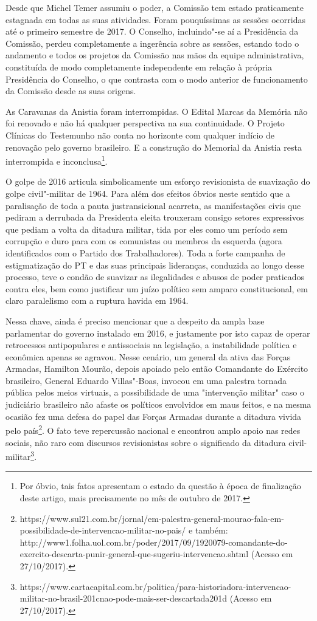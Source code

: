 Desde que Michel Temer assumiu o poder, a Comissão tem estado
praticamente estagnada em todas as suas atividades. Foram pouquíssimas
as sessões ocorridas até o primeiro semestre de 2017. O Conselho,
incluindo"-se aí a Presidência da Comissão, perdeu completamente a
ingerência sobre as sessões, estando todo o andamento e todos os
projetos da Comissão nas mãos da equipe administrativa, constituída de
modo completamente independente em relação à própria Presidência do
Conselho, o que contrasta com o modo anterior de funcionamento da
Comissão desde as suas origens.

As Caravanas da Anistia foram interrompidas. O Edital Marcas da Memória
não foi renovado e não há qualquer perspectiva na sua continuidade. O
Projeto Clínicas do Testemunho não conta no horizonte com qualquer
indício de renovação pelo governo brasileiro. E a construção do Memorial
da Anistia resta interrompida e inconclusa\footnote{Por óbvio, tais
  fatos apresentam o estado da questão à época de finalização deste
  artigo, mais precisamente no mês de outubro de 2017.}.

O golpe de 2016 articula simbolicamente um esforço revisionista de
suavização do golpe civil"-militar de 1964. Para além dos efeitos óbvios
neste sentido que a paralisação de toda a pauta justransicional
acarreta, as manifestações civis que pediram a derrubada da Presidenta
eleita trouxeram consigo setores expressivos que pediam a volta da
ditadura militar, tida por eles como um período sem corrupção e duro
para com os comunistas ou membros da esquerda (agora identificados com o
Partido dos Trabalhadores). Toda a forte campanha de estigmatização do
PT e das suas principais lideranças, conduzida ao longo desse processo,
teve o condão de suavizar as ilegalidades e abusos de poder praticados
contra eles, bem como justificar um juízo político sem amparo
constitucional, em claro paralelismo com a ruptura havida em 1964.

Nessa chave, ainda é preciso mencionar que a despeito da ampla base
parlamentar do governo instalado em 2016, e justamente por isto capaz de
operar retrocessos antipopulares e antissociais na legislação, a
instabilidade política e econômica apenas se agravou. Nesse cenário, um
general da ativa das Forças Armadas, Hamilton Mourão, depois apoiado
pelo então Comandante do Exército brasileiro, General Eduardo
Villas"-Boas, invocou em uma palestra tornada pública pelos meios
virtuais, a possibilidade de uma "intervenção militar" caso o judiciário
brasileiro não afaste os políticos envolvidos em maus feitos, e na mesma
ocasião fez uma defesa do papel das Forças Armadas durante a ditadura
vivida pelo país\footnote{https://www.sul21.com.br/jornal/em-palestra-general-mourao-fala-em-possibilidade-de-intervencao-militar-no-pais/
  e também:
  http://www1.folha.uol.com.br/poder/2017/09/1920079-comandante-do-exercito-descarta-punir-general-que-sugeriu-intervencao.shtml
  (Acesso em 27/10/2017).}. O fato teve repercussão nacional e encontrou
amplo apoio nas redes sociais, não raro com discursos revisionistas
sobre o significado da ditadura civil-militar\footnote{https://www.cartacapital.com.br/politica/para-historiadora-intervencao-militar-no-brasil-201cnao-pode-mais-ser-descartada201d
  (Acesso em 27/10/2017).}.

